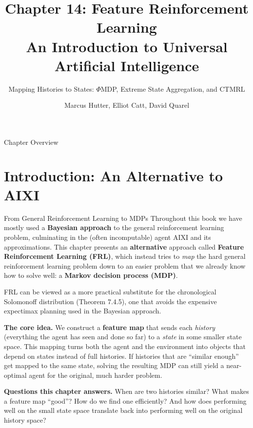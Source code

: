 \documentclass[aspectratio=169,10pt]{beamer}
\title[Ch.\,14 Feature Reinforcement Learning]{%
  \textbf{Chapter 14: Feature Reinforcement Learning}\\
  \normalsize An Introduction to Universal Artificial Intelligence}
\subtitle{Mapping Histories to States: $\Phi$MDP, Extreme State Aggregation, and CTMRL}
\author{Marcus Hutter, Elliot Catt, David Quarel}
\institute{Taylor \& Francis / CRC Press, 2024}
\date{}
\begin{document}
\begin{frame}
  \titlepage
\end{frame}

\begin{frame}{Chapter Overview}
  \tableofcontents
\end{frame}


\section{Introduction: An Alternative to AIXI}

\begin{frame}{From General Reinforcement Learning to MDPs}
  Throughout this book we have mostly used a \textbf{Bayesian approach} to
  the general reinforcement learning problem, culminating in the (often
  incomputable) agent AIXI and its approximations. This chapter presents an
  \textbf{alternative} approach called \textbf{Feature Reinforcement
  Learning (FRL)}, which instead tries to \emph{map} the hard general
  reinforcement learning problem down to an easier problem that we already
  know how to solve well: a \textbf{Markov decision process (MDP)}.

  \vspace{0.4em}
  FRL can be viewed as a more practical substitute for the chronological
  Solomonoff distribution (Theorem 7.4.5), one that avoids the expensive
  expectimax planning used in the Bayesian approach.

  \vspace{0.4em}
  \textbf{The core idea.} We construct a \textbf{feature map} that sends
  each \emph{history} (everything the agent has seen and done so far) to a
  \emph{state} in some smaller state space. This mapping turns both the
  agent and the environment into objects that depend on states instead of
  full histories. If histories that are ``similar enough'' get mapped to
  the same state, solving the resulting MDP can still yield a near-optimal
  agent for the original, much harder problem.

  \vspace{0.4em}
  \textbf{Questions this chapter answers.} When are two histories similar?
  What makes a feature map ``good''? How do we find one efficiently? And how
  does performing well on the small state space translate back into
  performing well on the original history space?
\end{frame}
\end{document}
